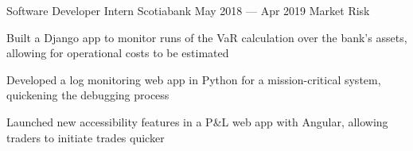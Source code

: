 \begin{cventries}
  \cventry
    {Software Developer Intern}
    {Scotiabank}
    {}
    {May 2018 --- Apr 2019}
    {Market Risk}
    {
      \begin{cvitems}
        \item {Built a Django app to monitor runs of the VaR calculation over the bank's assets, allowing for operational costs to be estimated}
        \item {Developed a log monitoring web app in Python for a mission-critical system, quickening the debugging process}
        \item {Launched new accessibility features in a P\&L web app with Angular, allowing traders to initiate trades quicker}
      \end{cvitems}
    }
\end{cventries}
